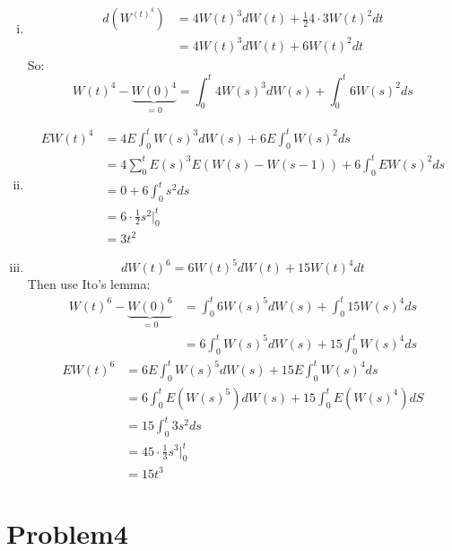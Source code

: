 \documentclass[11pt]{article} %
\begin{document}
\begin{enumerate}[(i)]
    \item \begin{align*}
        d(W^(t)^4) &= 4W(t)^3dW(t) + \frac{1}{2}4\cdot 3 W(t)^2 dt\\
                    &= 4W(t)^3dW(t) +6W(t)^2 dt
    \end{align*}
    So:
    \begin{equation*}
        W(t)^4 -\underbrace{W(0)^4}_{=0} = \int_0^t 4W(s)^3 dW(s) + \int_0^t 6W(s)^2 ds
    \end{equation*}

    \item \begin{align*}
        EW(t)^4 &= 4E\int_0^t W(s)^3 dW(s) + 6E\int_0^t W(s)^2 ds\\
                &= 4\sum_0^t E(s)^3 E(W(s)-W(s-1)) + 6\int_0^t EW(s)^2 ds\\
                &= 0+6\int_0^t s^2 ds\\
                &= 6\cdot \frac{1}{2} s^2|_0^t\\
                &= 3t^2
    \end{align*}
    \item \begin{equation*}
        dW(t)^6 = 6W(t)^5 dW(t) +15W(t)^4dt
    \end{equation*}
        Then use Ito's lemma:
        \begin{align*}
            W(t)^6 -\underbrace{W(0)^6}_{=0} &= \int_0^t 6W(s)^5 dW(s) +\int_0^t 15W(s)^4 ds\\
                                            &= 6\int_0^t W(s)^5 dW(s) + 15\int_0^t W(s)^4 ds
        \end{align*}
        \begin{align*}
            EW(t)^6 &= 6E\int_0^t W(s)^5 dW(s) + 15E\int_0^t W(s)^4 ds\\
                    &= 6\int_0^t E(W(s)^5)dW(s) + 15 \int_0^t E(W(s)^4)dS\\
                    &= 15\int_0^t 3s^2 ds\\
                    &= 45 \cdot \frac{1}{3}s^3|_0^t\\
                    &= 15t^3
        \end{align*}
    
\end{enumerate}


\section*{Problem4}
\end{document}
